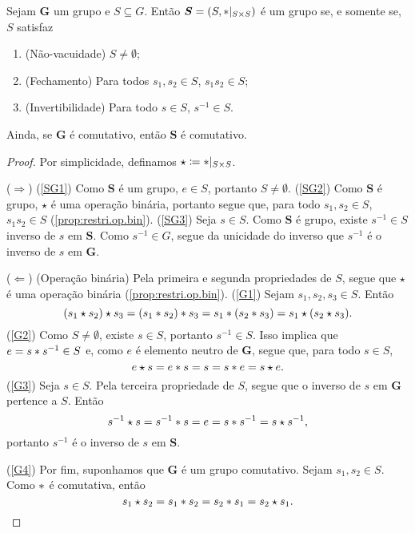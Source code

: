 \begin{prop}
\label{alge:prop.subgru}
Sejam $\bm G$ um grupo e $S \subseteq G$. Então $\bm S=(S,\ast|_{S \times S})$ é um grupo se, e somente se, $S$ satisfaz
	\begin{enumerate}[label=\textbf{SG\arabic*.},ref={SG\arabic*}]
	\item \label{SG1} (Não-vacuidade) $S \neq \emptyset$;
	\item \label{SG2} (Fechamento) Para todos $s_1,s_2 \in S$, $s_1s_2 \in S$;
	\item \label{SG3} (Invertibilidade) Para todo $s \in S$,  $s^{-1} \in S$.
	\end{enumerate}	
\noindent
Ainda, se $\bm G$ é comutativo, então $\bm S$ é comutativo.
\end{prop}
\begin{proof}
Por simplicidade, definamos $\star \coloneqq \ast|_{S \times S}$.

($\Rightarrow$) (\ref{SG1}) Como $\bm S$ é um grupo, $e \in S$, portanto $S \neq \emptyset$.
(\ref{SG2}) Como $\bm S$ é grupo, $\star$ é uma operação binária, portanto segue que, para todo $s_1,s_2 \in S$, $s_1s_2 \in S$ (\ref{prop:restri.op.bin}).
(\ref{SG3}) Seja $s \in S$. Como $\bm S$ é grupo, existe $s^{-1} \in S$ inverso de $s$ em $\bm S$. Como $s^ {-1} \in G$, segue da unicidade do inverso que $s^{-1}$ é o inverso de $s$ em $\bm G$.

($\Leftarrow$)
(Operação binária) Pela primeira e segunda propriedades de $S$, segue que $\star$ é uma operação binária (\ref{prop:restri.op.bin}).
(\ref{G1}) Sejam $s_1,s_2,s_3 \in S$. Então
	\begin{equation*}
	(s_1 \star s_2) \star s_3 = (s_1 \ast s_2) \ast s_3 = s_1 \ast (s_2 \ast s_3) = s_1 \star (s_2 \star s_3).
	\end{equation*}
(\ref{G2}) Como $S \neq \emptyset$, existe $s \in S$, portanto $s^{-1} \in S$. Isso implica que $e=s \ast s^{-1} \in S$ e, como $e$ é elemento neutro de $\bm G$, segue que, para todo $s \in S$,
	\begin{equation*}
	e \star s = e \ast s = s = s \ast e = s \star e.
	\end{equation*}
(\ref{G3}) Seja $s \in S$. Pela terceira propriedade de $S$, segue que o inverso de $s$ em $\bm G$ pertence a $S$. Então
	\begin{equation*}
	s^ {-1} \star s = s^{-1} \ast s = e = s \ast s^{-1} = s \star s^{-1},
	\end{equation*}
portanto $s^{-1}$ é o inverso de $s$ em $\bm S$.

(\ref{G4}) Por fim, suponhamos que $\bm G$ é um grupo comutativo. Sejam $s_1,s_2 \in S$. Como $\ast$ é comutativa, então
	\begin{equation*}
	s_1 \star s_2 = s_1 \ast s_2 = s_2 \ast s_1 = s_2 \star s_1.
	\end{equation*}
\end{proof}

